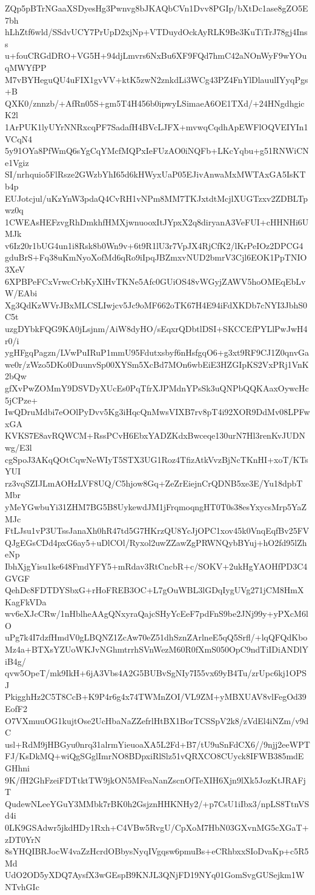 ZQp5pBTrNGaaXSDyesHg3Pwnvg8bJKAQbCVn1Dvv8PGIp/bXtDc1ase8gZO5E7bh
hLhZtf6wld/SSdvUCY7PrUpD2xjNp+VTDuydOckAyRLK9Be3KuTiTrJ78gj4Inss
u+fouCRGdDRO+VG5H+94djLmvrs6NxBu6XF9FQd7hmC42aNOnWyF9wYOuqMWYfPP
M7vBYHeguQU4uFIX1gvVV+ktK5zwN2znkdLi3WCg43PZ4FnYlDlauulIYyqPgs+B
QXK0/znnzb/+AfRn05S+gm5T4H456b0ipwyLSimaeA6OE1TXd/+24HNgdhgicK2l
1ArPUK1lyUYrNNRxcqPF7SadafH4BVcLJFX+mvwqCqdhApEWFlOQVEIYIn1VCqN4
5y91OYa8PfWmQ6sYgCqYMcfMQPxIeFUzAO0iNQFb+LKcYqbu+g51RNWiCNe1Vgiz
SI/nrhquio5FlRsze2GWzbYhI65d6kHWyxUaP05EJivAnwaMxMWTAxGA5IsKTb4p
EUJotcjul/uKzYnW3pdaQ4CvRH1vNPm8MM7TKJxtdtMcjlXUGTzxv2ZDBLTpwz0q
1CWEAsHEFzvgRhDmkhfHMXjwnuooxItJYpxX2q8diryanA3VeFUI+cHHNHi6UMJk
v6Iz20r1bUG4un1i8Rsk8b0Wn9v+6t9R1lU3r7VpJX4RjCfK2/lKrPeIOz2DPCG4
gduBrS+Fq38uKmNyoXofMd6qRo9iIpqJBZmxvNUD2bmrV3Cjl6EOK1PpTNIO3XeV
6XPBPeFCxVrwcCrbKyXlHvTKNe5Afc0GUiOS48vWGyjZAWV5hoOMEqEbLvW/EAbi
Xg3QdKzWVrJBxMLCSLIwjcv5Jc9oMF662oTK67H4E94iFdXKDb7cNYI3JbhS0C5t
uzgDYbkFQG9KA0jLsjnm/AiW8dyHO/sEqxrQDbtlDSI+SKCCEfPYLlPwJwH4r0/i
ygHFgqPagzn/LVwPuIRuP1mmU95Fdutxsbyf6nHsfgqO6+g3xt9RF9CJ1Z0qnvGa
we0r/zWzo5DKo0DuunvSp00XYSm5XcBd7MOn6wbEiE3HZGIpKS2VxPRj1VnK2bQw
gfXvPwZOMmY9DSVDyXUcEs0PqTfrXJPMdnYPsSk3uQNPbQQKAaxOywcHc5jCPze+
IwQDruMdbi7eOOlPyDvv5Kg3iHqcQnMwsVIXB7rv8pT4i92XOR9DdMv08LPFwxGA
KVKS7E8avRQWCM+RssPCvH6EbxYADZKdxBwceqe130urN7Hl3renKvJUDNwg/E3l
cgSpoJ3AKqQOtCqwNeWIyT5STX3UG1Roz4TfizAtkVvzBjNcTKnHI+xoT/KTsYUI
rz3vqSZIJLmAOHzLVF8UQ/C5hjow8Gq+ZeZrEiejnCrQDNB5xe3E/Yu18dpbTMbr
yMeYGwbuYi31ZHM7BG5B8UykewdJM1jFrqmoqngHT0T0s38esYxycsMrp5YaZMJc
FtLJsu1vP3UTssJanaXh0hR47td5G7HKrzQU8YcJjOPC1xov45k0VnqEqfBv25FV
QJgEGsCDd4pxG6ay5+uDlCOl/Ryxol2uwZZawZgPRWNQybBYuj+hO2fd95lZheNp
IbhXjgYisu1ke648FmdYFY5+mRdav3RtCncbR+c/SOKV+2ukHgYAOHfPD3C4GVGF
QehDc8FDTDYSbxG+rHoFREB3OC+L7gOuWBL3lGDqIygUVg271jCM8HmXKagFkVDa
wv6eXJcCRw/1nHblheAAgQNxyraQajcSHyYcEeF7pdFnS9be2JNj99y+yPXcM6lO
uPg7k4I7dzfHmdV0gLBQNZ1ZcAw70eZ51dhSznZArlneE5qQ5Srfl/+lqQFQdKbo
Mz4a+BTXsYZUoWKJvNGhmtrrhSVnWezM60R0fXmS050OpC9ndTiIDiANDlYiB4g/
qvw5OpeT/mk9IkH+6jA3Vbs4A2G5BUBvSgNIy7I55vx69yB4Tu/zrUpc6kj1OPSJ
PkigghHz2C5T8CcB+K9P4r6g4x74TWMnZOI/VL9ZM+yMBXUAV8vlFegOd39EofF2
O7VXmuuOG1kujtOse2UcHbaNaZZefrlHtBX1BorTCSSpV2k8/zVdEl4iNZm/v9dC
usl+RdM9jHBGyu0nrq31alrmYieuoaXA5L2Fd+B7/tU9uSnFdCX6//9njj2eeWPT
FJ/KsDkMQ+wiQgSGglImrNO8BDpxiRlSlz51vQRXCO8CUyck8IFWB385mdEGHhni
9K/fH2GhFzeiFDTtktTW9jkON5MFeaNanZscnOfTeXIH6Xjn9lXk5JozKtJRAFjT
QudewNLeeYGuY3MMbk7rBK0h2GsjznHHKNHy2/+p7CsU1iIbx3/npLS8TtnVSd4i
0LK9GSAdwr5jkdHDy1Rxh+C4VBw5RvgU/CpXoM7HbN03GXvnMG5cXGaT+zDT0YrN
8sYHQIBRJocW4vaZzHcrdOBbysNyqIVgqsw6pmuBs+eCRhbxxSIoDvaKp+c5R5Md
UdO2OD5yXDQ7AysfX3wGEspB9KNJL3QNjFD19NYq01GomSvgGUSejkm1WNTvhGIc
